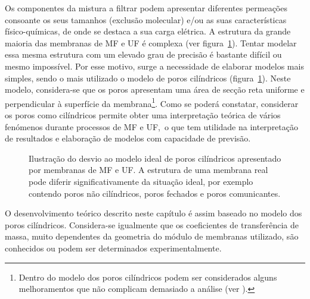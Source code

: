 Os componentes da mistura a filtrar podem apresentar diferentes permeações consoante os seus tamanhos (exclusão molecular) e/ou as suas características físico-químicas, de onde se destaca a sua carga elétrica. A estrutura da grande maioria das membranas de MF e UF é complexa (ver figura~\ref{fig:mpcilindricos}). Tentar modelar essa mesma estrutura com um elevado grau de precisão é bastante difícil ou mesmo impossível. Por esse motivo, surge a necessidade de elaborar modelos mais simples, sendo o mais utilizado o modelo de poros cilíndricos (figura~\ref{fig:mpcilindricos}). Neste modelo, considera-se que os poros apresentam uma área de secção reta uniforme e perpendicular à superfície da membrana\footnote{Dentro do modelo dos poros cilíndricos podem ser considerados alguns melhoramentos que não complicam demasiado a análise (ver \cite{moraompa,mulder}).}. Como se poderá constatar, considerar os poros como cilíndricos permite obter uma interpretação teórica de vários fenómenos durante processos de MF e UF,\ o que tem utilidade na interpretação de resultados e elaboração de modelos com capacidade de previsão. 

\begin{figure}
	\centering
	
	\caption[Desvio ao modelo de poros cilíndricos]{Ilustração do desvio ao modelo ideal de poros cilíndricos apresentado por membranas de MF e UF\@. A estrutura de uma membrana real pode diferir significativamente da situação ideal, por exemplo contendo poros não cilíndricos, poros fechados e poros comunicantes.}
	\label{fig:mpcilindricos}
\end{figure}

O desenvolvimento teórico descrito neste capítulo é assim baseado no modelo dos poros cilíndricos. Considera-se igualmente que os coeficientes de transferência de massa, muito dependentes da geometria do módulo de membranas utilizado, são conhecidos ou podem ser determinados experimentalmente.

